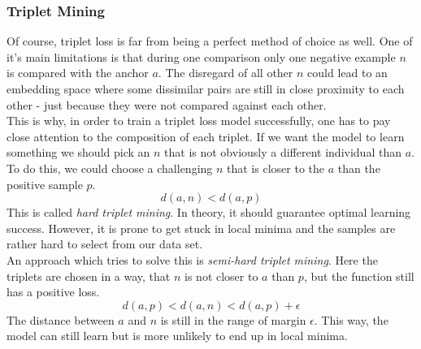\subsubsection{Triplet Mining} \label{subsec:mining}
Of course, triplet loss is far from being a perfect method of choice as well. One of it's main limitations is that during one comparison only one negative example \(n\) is compared with the anchor \(a\). The disregard of all other \(n\) could lead to an embedding space where some dissimilar pairs are still in close proximity to each other - just because they were not compared against each other. \cite{Sohn_2016} \\
This is why, in order to train a triplet loss model successfully, one has to pay close attention to the composition of each triplet. If we want the model to learn something we should pick an \(n\) that is not obviously a different individual than \(a\). \\

\noindent To do this, we could choose a challenging \(n\) that is closer to the \(a\) than the positive sample \(p\).
\[ d(a,n) < d(a,p) \]
This is called \textit{hard triplet mining}. In theory, it should guarantee optimal learning success. However, it is prone to get stuck in local minima and the samples are rather hard to select from our data set. \\

\noindent An approach which tries to solve this is \textit{semi-hard triplet mining}. Here the triplets are chosen in a way, that \(n\) is not closer to \(a\) than \(p\), but the function still has a positive loss.
\[ d(a,p) < d(a,n) < d(a,p) + \epsilon \]
The distance between \(a\) and \(n\) is still in the range of margin \(\epsilon\). This way, the model can still learn but is more unlikely to end up in local minima. \\

